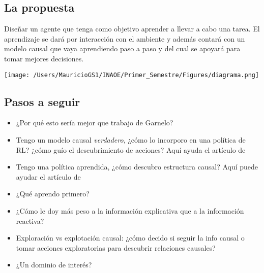 \documentclass[11pt]{article}
\theoremstyle{plain}
\begin{document}
\subsection{La propuesta}
Diseñar un agente que tenga como objetivo aprender a llevar a cabo una tarea. El aprendizaje se dará por interacción con el ambiente y además contará con un modelo causal que vaya aprendiendo paso a paso y del cual se apoyará para  tomar mejores decisiones.
\begin{center}
\texttt{[image: /Users/MauricioGS1/INAOE/Primer\_Semestre/Figures/diagrama.png]}
\end{center}
\subsection{Pasos a seguir}
\begin{itemize}
\item ¿Por qué esto sería mejor que trabajo de Garnelo?
\item Tengo un modelo causal \textit{verdadero}, ¿cómo lo incorporo en una política de RL? ¿cómo guío el descubrimiento de acciones? Aquí ayuda el artículo de \cite{lattimoreNIPS2016}
\item Tengo una política aprendida, ¿cómo descubro estructura causal? Aquí puede ayudar el artículo de \cite{ortega2014generalized}
\item ¿Qué aprendo primero?
\item ¿Cómo le doy más peso a la información explicativa que a la información reactiva?
\item Exploración vs explotación causal: ¿cómo decido si seguir la info causal o tomar acciones exploratorias para descubrir relaciones causales? 
\item ¿Un dominio de interés? 
\end{itemize}
\end{document}
